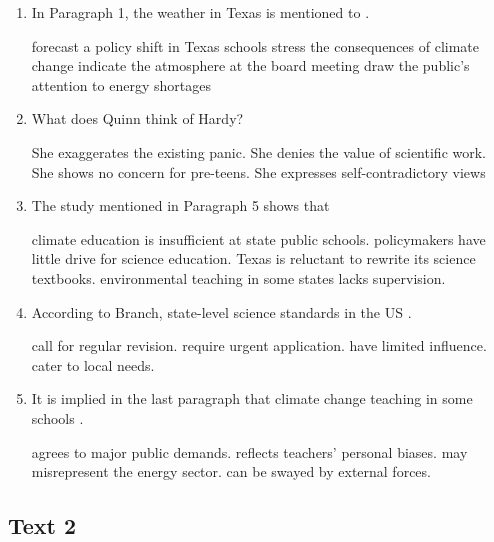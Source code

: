 \begin{enumerate}[resume]

\item

In Paragraph 1, the weather in Texas is mentioned to \lineread.

\fourchoices
{forecast a policy shift in Texas schools}
{stress the consequences of climate change}
{indicate the atmosphere at the board meeting}
{draw the public's attention to energy shortages}


\item

What does Quinn think of Hardy?

\fourchoices
{She exaggerates the existing panic.}
{She denies the value of scientific work.}
{She shows no concern for pre-teens.}
{She expresses self-contradictory views}

\item

The study mentioned in Paragraph 5 shows that \lineread

\fourchoices
{climate education is insufficient at state public schools.}
{policymakers have little drive for science education.}
{Texas is reluctant to rewrite its science textbooks.}
{environmental teaching in some states lacks supervision.}

\item

According to Branch, state-level science standards in the US \lineread.

\fourchoices
{call for regular revision.}
{require urgent application.}
{have limited influence.}
{cater to local needs.}

\item

It is implied in the last paragraph that climate change teaching in some schools \lineread.

\fourchoices
{agrees to major public demands.}
{reflects teachers' personal biases.}
{may misrepresent the energy sector.}
{can be swayed by external forces.}

\end{enumerate}


\newpage
\subsection{Text 2}

